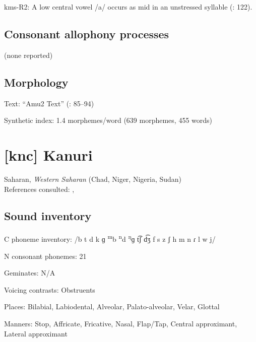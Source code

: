 {\begin{appendixdesc}
\item[kms-R2:] A low central vowel /a/ occurs as mid in an unstressed syllable (\citealt{SandersSanders1980}: 122).
\end{appendixdesc}
\subsection*{Consonant allophony processes}

(none reported)
\subsection*{Morphology}

\begin{appendixdesc}

\item[Text:] “Amu2 Text” (\citealt{SandersSanders1994}: 85--94)

\item[Synthetic index:] 1.4 morphemes/word (639 morphemes, 455 words)
\end{appendixdesc}
\section*{[knc] Kanuri}   %
Saharan, \textit{Western Saharan} (Chad, Niger, Nigeria, Sudan)\medskip\\
References consulted: \citet{Cyffer1998}, \citet{Hutchison1981}
\subsection*{Sound inventory}
\begin{appendixdesc}

\item[C phoneme inventory:] /b t d k ɡ \textsuperscript{m}b \textsuperscript{n}d \textsuperscript{ŋ}ɡ t͡ʃ d͡ʒ f s z ʃ h m n ɾ l w j/

\item[N consonant phonemes:] 21

\item[Geminates:] N/A

\item[Voicing contrasts:] Obstruents

\item[Places:] Bilabial, Labiodental, Alveolar, Palato-alveolar, Velar, Glottal

\item[Manners:] Stop, Affricate, Fricative, Nasal, Flap/Tap, Central approximant, Lateral approximant


\end{appendixdesc}}

